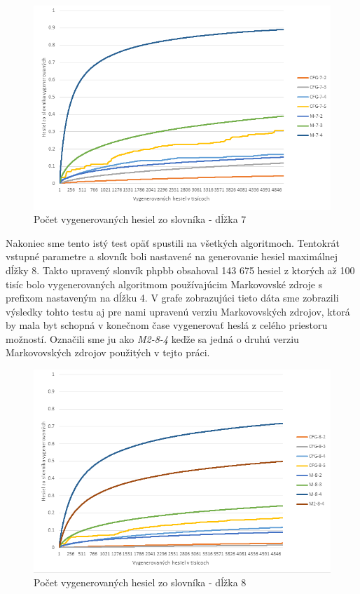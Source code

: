 \begin{figure}[ht]
    \centering
    \includegraphics[width=1\textwidth]{sameDictAcc7}
    \caption{Počet vygenerovaných hesiel zo slovníka - dĺžka 7}
    \label{fig:Acc7}
\end{figure}

Nakoniec sme tento istý test opäť spustili na všetkých algoritmoch. Tentokrát vstupné parametre a slovník boli nastavené na generovanie hesiel maximálnej dĺžky 8. Takto upravený slonvík phpbb obsahoval 143 675 hesiel z ktorých až 100 tisíc bolo vygenerovaných algoritmom používajúcim Markovovské zdroje s prefixom nastaveným na dĺžku 4. V grafe zobrazujúci tieto dáta sme zobrazili výsledky tohto testu aj pre nami upravenú verziu Markovovských zdrojov, ktorá by mala byt schopná v konečnom čase vygenerovať heslá z celého priestoru možností. Označili sme ju ako \emph{M2-8-4} keďže sa jedná o druhú verziu Markovovských zdrojov použitých v tejto práci.

\begin{figure}[ht]
    \centering
    \includegraphics[width=1\textwidth]{sameDictAcc8}
    \caption{Počet vygenerovaných hesiel zo slovníka - dĺžka 8}
    \label{fig:Acc8}
\end{figure}

